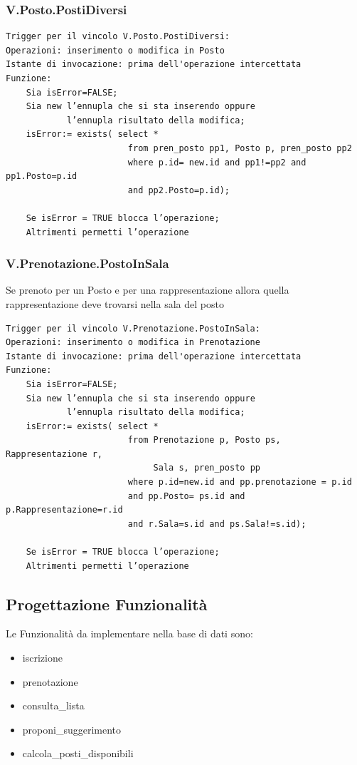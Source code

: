 \documentclass[12pt, letterpaper]{article}
\begin{document}
\subsubsection{V.Posto.PostiDiversi}
\begin{verbatim}
Trigger per il vincolo V.Posto.PostiDiversi:
Operazioni: inserimento o modifica in Posto
Istante di invocazione: prima dell'operazione intercettata
Funzione:
    Sia isError=FALSE;
    Sia new l’ennupla che si sta inserendo oppure 
            l’ennupla risultato della modifica;
    isError:= exists( select *
                        from pren_posto pp1, Posto p, pren_posto pp2
                        where p.id= new.id and pp1!=pp2 and pp1.Posto=p.id 
                        and pp2.Posto=p.id);
                    
    Se isError = TRUE blocca l’operazione;
    Altrimenti permetti l’operazione
\end{verbatim}\newpage
\subsubsection{V.Prenotazione.PostoInSala}
Se prenoto per un Posto e per una rappresentazione allora quella rappresentazione deve trovarsi nella sala del posto
\begin{verbatim}
Trigger per il vincolo V.Prenotazione.PostoInSala:
Operazioni: inserimento o modifica in Prenotazione
Istante di invocazione: prima dell'operazione intercettata
Funzione:
    Sia isError=FALSE;
    Sia new l’ennupla che si sta inserendo oppure 
            l’ennupla risultato della modifica;
    isError:= exists( select *
                        from Prenotazione p, Posto ps, Rappresentazione r, 
                             Sala s, pren_posto pp
                        where p.id=new.id and pp.prenotazione = p.id 
                        and pp.Posto= ps.id and p.Rappresentazione=r.id 
                        and r.Sala=s.id and ps.Sala!=s.id);
                    
    Se isError = TRUE blocca l’operazione;
    Altrimenti permetti l’operazione
\end{verbatim}
\newpage \subsection{Progettazione Funzionalità}
Le Funzionalità da implementare nella base di dati sono:
\begin{itemize}
    \item iscrizione
    \item prenotazione
    \item consulta\_lista
    \item proponi\_suggerimento
    \item calcola\_posti\_disponibili
\end{itemize}
\end{document}
